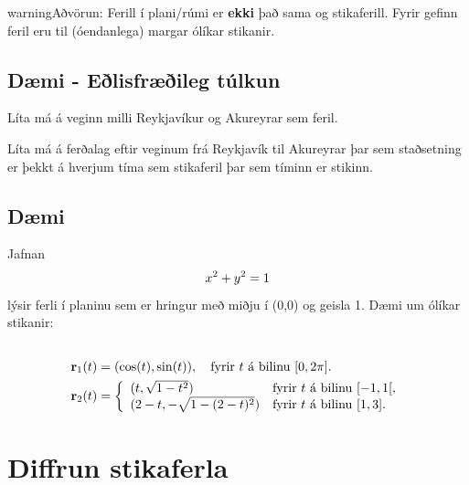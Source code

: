 \documentclass[a4paper,10pt,icelandic]{sphinxmanual}
\begin{document}
\begin{notice}{warning}{Aðvörun:}
Ferill í plani/rúmi er \textbf{ekki} það sama og stikaferill. Fyrir gefinn
feril eru til (óendanlega) margar ólíkar stikanir.
\end{notice}


\subsection{Dæmi - Eðlisfræðileg túlkun}
\label{Kafli1:daemi-elisfraeileg-tulkun}
Líta má á veginn milli Reykjavíkur og Akureyrar sem feril.

Líta má á ferðalag eftir veginum frá Reykjavík til Akureyrar þar sem
staðsetning er þekkt á hverjum tíma sem stikaferil þar sem tíminn er
stikinn.


\subsection{Dæmi}
\label{Kafli1:daemi}
Jafnan
\begin{gather}
\begin{split}\displaystyle x^2+y^2 = 1\end{split}\notag
\end{gather}
lýsir ferli í planinu sem er hringur með miðju í (0,0) og geisla 1. Dæmi
um ólíkar stikanir:
\begin{gather}
\begin{split}\displaystyle\end{split}\notag\\\begin{split}\begin{aligned}
\mbox{${\bf r}$}_1(t) &= (\cos(t),\sin(t)), \quad \text{fyrir $t$ á bilinu $[0,2\pi].$} \\
\mbox{${\bf r}$}_2(t) &= \left\{\begin{array}{ll}
(t,\sqrt{1-t^2}) & \text{fyrir $t$ á bilinu $[-1,1[,$} \\
(2-t,-\sqrt{1-(2-t)^2}) & \text{fyrir $t$ á bilinu $[1,3].$}
\end{array}\right.\end{aligned}\end{split}\notag
\end{gather}


\section{Diffrun stikaferla}
\label{Kafli1:diffrun-stikaferla}
\end{document}
